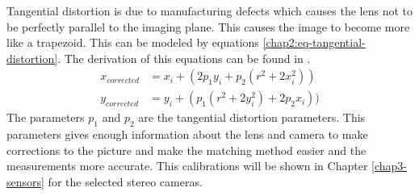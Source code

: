 Tangential distortion is due to manufacturing defects which causes the lens not to be
perfectly parallel to the imaging plane. This causes the image to become more like a
trapezoid. This can be modeled by equations \eqref{chap2:eq-tangential-distortion}. The
derivation of this equations can be found in \cite{brown66}.
\begin{equation}
    \label{chap2:eq-tangential-distortion}
    \begin{aligned}
        x_{corrected} &= x_i + (2 p_1 y_i + p_2 (r^2 + 2 x_i^2)) \\
        y_{corrected} &= y_i + ( p_1 (r^2 + 2 y_i^2) + 2 p_2 x_i))
    \end{aligned}
\end{equation}
The parameters $p_1$ and $p_2$ are the tangential distortion parameters. This parameters
gives enough information about the lens and camera to make corrections to the picture and
make the matching method easier and the measurements more accurate. This calibrations will
be shown in Chapter \ref{chap3-sensors} for the selected stereo cameras. 

